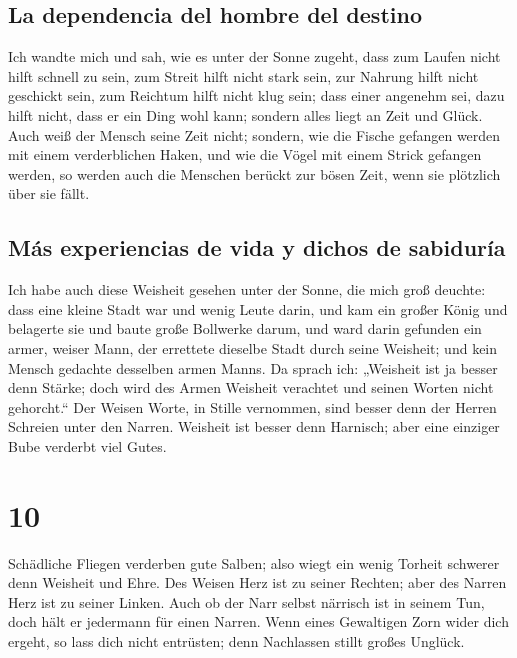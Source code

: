 \hypertarget{la-dependencia-del-hombre-del-destino}{%
\subsection{La dependencia del hombre del
destino}\label{la-dependencia-del-hombre-del-destino}}

 Ich wandte mich und sah, wie es unter der Sonne zugeht,
dass zum Laufen nicht hilft schnell zu sein, zum Streit hilft nicht
stark sein, zur Nahrung hilft nicht geschickt sein, zum Reichtum hilft
nicht klug sein; dass einer angenehm sei, dazu hilft nicht, dass er ein
Ding wohl kann; sondern alles liegt an Zeit und Glück. 
Auch weiß der Mensch seine Zeit nicht; sondern, wie die Fische gefangen
werden mit einem verderblichen Haken, und wie die Vögel mit einem Strick
gefangen werden, so werden auch die Menschen berückt zur bösen Zeit,
wenn sie plötzlich über sie fällt.

\hypertarget{muxe1s-experiencias-de-vida-y-dichos-de-sabiduruxeda}{%
\subsection{Más experiencias de vida y dichos de
sabiduría}\label{muxe1s-experiencias-de-vida-y-dichos-de-sabiduruxeda}}

 Ich habe auch diese Weisheit gesehen unter der Sonne,
die mich groß deuchte:  dass eine kleine Stadt war und
wenig Leute darin, und kam ein großer König und belagerte sie und baute
große Bollwerke darum,  und ward darin gefunden ein
armer, weiser Mann, der errettete dieselbe Stadt durch seine Weisheit;
und kein Mensch gedachte desselben armen Manns.  Da
sprach ich: „Weisheit ist ja besser denn Stärke; doch wird des Armen
Weisheit verachtet und seinen Worten nicht gehorcht.`` 
Der Weisen Worte, in Stille vernommen, sind besser denn der Herren
Schreien unter den Narren.  Weisheit ist besser denn
Harnisch; aber eine einziger Bube verderbt viel Gutes.

\hypertarget{section-9}{%
\section{10}\label{section-9}}

 Schädliche Fliegen verderben gute Salben; also wiegt ein
wenig Torheit schwerer denn Weisheit und Ehre.  Des Weisen
Herz ist zu seiner Rechten; aber des Narren Herz ist zu seiner Linken.
 Auch ob der Narr selbst närrisch ist in seinem Tun, doch
hält er jedermann für einen Narren.  Wenn eines Gewaltigen
Zorn wider dich ergeht, so lass dich nicht entrüsten; denn Nachlassen
stillt großes Unglück.

